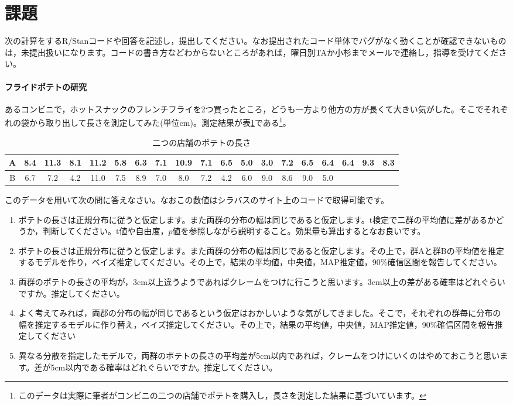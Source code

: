 \documentclass{ltjsbook}
\begin{document}
\section{課題}
次の計算をするR/Stanコードや回答を記述し，提出してください。なお提出されたコード単体でバグがなく動くことが確認できないものは，未提出扱いになります。コードの書き方などわからないところがあれば，曜日別TAか小杉までメールで連絡し，指導を受けてください。

\paragraph{フライドポテトの研究}
あるコンビニで，ホットスナックのフレンチフライを2つ買ったところ，どうも一方より他方の方が長くて大きい気がした。そこでそれぞれの袋から取り出して長さを測定してみた(単位cm)。測定結果が表\ref{tab::19_01}である\footnote{このデータは実際に筆者がコンビニの二つの店舗でポテトを購入し，長さを測定した結果に基づいています。}。
\begin{table}[ht]
	\center
	\caption{二つの店舗のポテトの長さ}
	\begin{tabular}{c|cccccccccccccccccc}\hline
		A & 8.4 & 11.3 & 8.1 & 11.2 & 5.8 & 6.3 & 7.1 & 10.9 & 7.1 & 6.5 & 5.0 & 3.0 & 7.2 & 6.5 & 6.4 & 6.4 & 9.3 & 8.3 \\\hline
		B & 6.7 & 7.2  & 4.2 & 11.0 & 7.5 & 8.9 & 7.0 & 8.0  & 7.2 & 4.2 & 6.0 & 9.0 & 8.6 & 9.0 & 5.0 &     &     &     \\\hline
	\end{tabular}
	\label{tab::19_01}
\end{table}
このデータを用いて次の問に答えなさい。なおこの数値はシラバスのサイト上のコードで取得可能です。
\begin{enumerate}
	\item ポテトの長さは正規分布に従うと仮定します。また両群の分布の幅は同じであると仮定します。t検定で二群の平均値に差があるかどうか，判断してください。t値や自由度，$p$値を参照しながら説明すること。効果量も算出するとなお良いです。
	\item ポテトの長さは正規分布に従うと仮定します。また両群の分布の幅は同じであると仮定します。その上で，群Aと群Bの平均値を推定するモデルを作り，ベイズ推定してください。その上で，結果の平均値，中央値，MAP推定値，90\%確信区間を報告してください。
	\item 両群のポテトの長さの平均が，3cm以上違うようであればクレームをつけに行こうと思います。3cm以上の差がある確率はどれぐらいですか。推定してください。
	\item よく考えてみれば，両郡の分布の幅が同じであるという仮定はおかしいような気がしてきました。そこで，それぞれの群毎に分布の幅を推定するモデルに作り替え，ベイズ推定してください。その上で，結果の平均値，中央値，MAP推定値，90\%確信区間を報告推定してください
	\item 異なる分散を指定したモデルで，両群のポテトの長さの平均差が5cm以内であれば，クレームをつけにいくのはやめておこうと思います。差が5cm以内である確率はどれぐらいですか。推定してください。
\end{enumerate}
\end{document}
